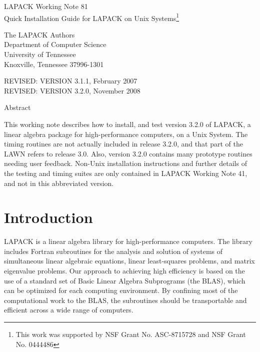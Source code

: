 \documentclass[11pt]{report}
\begin{document}
\begin{center}
  {\Large LAPACK Working Note 81\\
  Quick Installation Guide for LAPACK on Unix Systems\footnote{This work was
 supported by NSF Grant No. ASC-8715728  and NSF Grant No. 0444486}}
\end{center}
\begin{center}
  The LAPACK Authors\\
  Department of Computer Science \\
  University of Tennessee \\
  Knoxville, Tennessee  37996-1301 \\
\end{center}
\begin{center}
  REVISED:  VERSION 3.1.1, February 2007 \\
  REVISED:  VERSION 3.2.0, November 2008
\end{center}

\begin{center}
Abstract
\end{center}
This working note describes how to install, and test version 3.2.0
of LAPACK, a linear algebra package for high-performance
computers, on a Unix System.  The timing routines are not actually included in
release 3.2.0, and that part of the LAWN refers to release 3.0.  Also,
version 3.2.0 contains many prototype routines needing user feedback.
Non-Unix installation instructions and
further details of the testing and timing suites are only contained in
LAPACK Working Note 41, and not in this abbreviated version.
\newpage

\tableofcontents

\newpage

\section{Introduction}

LAPACK is a linear algebra library for high-performance
computers.
The library includes Fortran subroutines for
the analysis and solution of systems of simultaneous linear algebraic
equations, linear least-squares problems, and matrix eigenvalue
problems.
Our approach to achieving high efficiency is based on the use of
a standard set of Basic Linear Algebra Subprograms (the BLAS),
which can be optimized for each computing environment.
By confining most of the computational work to the BLAS,
the subroutines should be
transportable and efficient across a wide range of computers.
\end{document}
